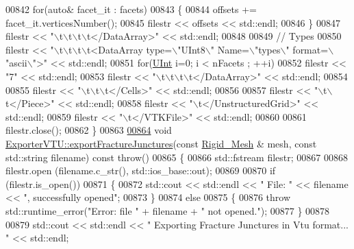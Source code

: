 \begin{DoxyCode}
00842     \textcolor{keywordflow}{for}(\textcolor{keyword}{auto}& facet\_it : facets)
00843     \{
00844         offsets += facet\_it.verticesNumber();
00845         filestr << offsets << std::endl;
00846     \}
00847     filestr << \textcolor{stringliteral}{"\(\backslash\)t\(\backslash\)t\(\backslash\)t\(\backslash\)t</DataArray>"} << std::endl;
00848 
00849     \textcolor{comment}{//  Types}
00850     filestr << \textcolor{stringliteral}{"\(\backslash\)t\(\backslash\)t\(\backslash\)t\(\backslash\)t<DataArray type=\(\backslash\)"UInt8\(\backslash\)" Name=\(\backslash\)"types\(\backslash\)" format=\(\backslash\)"ascii\(\backslash\)">"} << std::endl;
00851     \textcolor{keywordflow}{for}(\hyperlink{namespaceFVCode3D_a4bf7e328c75d0fd504050d040ebe9eda}{UInt} i=0; i < nFacets ; ++i)
00852         filestr << \textcolor{stringliteral}{"7"} << std::endl;
00853     filestr << \textcolor{stringliteral}{"\(\backslash\)t\(\backslash\)t\(\backslash\)t\(\backslash\)t</DataArray>"} << std::endl;
00854 
00855     filestr << \textcolor{stringliteral}{"\(\backslash\)t\(\backslash\)t\(\backslash\)t</Cells>"} << std::endl;
00856 
00857     filestr << \textcolor{stringliteral}{"\(\backslash\)t\(\backslash\)t</Piece>"} << std::endl;
00858     filestr << \textcolor{stringliteral}{"\(\backslash\)t</UnstructuredGrid>"} << std::endl;
00859     filestr << \textcolor{stringliteral}{"\(\backslash\)t</VTKFile>"} << std::endl;
00860 
00861     filestr.close();
00862 \}
00863 
\hypertarget{ExportVTU_8cpp_source.tex_l00864}{}\hyperlink{classFVCode3D_1_1ExporterVTU_aef7601095b83f975d009f9cb68563ae4}{00864} \textcolor{keywordtype}{void} \hyperlink{classFVCode3D_1_1ExporterVTU_aef7601095b83f975d009f9cb68563ae4}{ExporterVTU::exportFractureJunctures}(\textcolor{keyword}{const} 
      \hyperlink{classFVCode3D_1_1Rigid__Mesh}{Rigid\_Mesh} & mesh, \textcolor{keyword}{const} std::string filename) \textcolor{keyword}{const} \textcolor{keywordflow}{throw}()
00865 \{
00866     std::fstream filestr;
00867 
00868     filestr.open (filename.c\_str(), std::ios\_base::out);
00869 
00870     \textcolor{keywordflow}{if} (filestr.is\_open())
00871     \{
00872         std::cout << std::endl << \textcolor{stringliteral}{" File: "} << filename << \textcolor{stringliteral}{", successfully opened"};
00873     \}
00874     \textcolor{keywordflow}{else}
00875     \{
00876         \textcolor{keywordflow}{throw} std::runtime\_error(\textcolor{stringliteral}{"Error: file "} + filename + \textcolor{stringliteral}{" not opened."});
00877     \}
00878 
00879     std::cout << std::endl << \textcolor{stringliteral}{" Exporting Fracture Junctures in Vtu format... "} << std::endl;

\end{DoxyCode}
